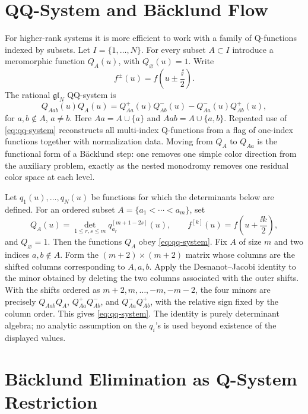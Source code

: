 \section{QQ-System and Bäcklund Flow}

For higher-rank systems it is more efficient to work with a family of
Q-functions indexed by subsets.  Let \(I=\{1,\ldots,N\}\).  For every subset
\(A\subset I\) introduce a meromorphic function \(Q_A(u)\), with
\(Q_\varnothing(u)=1\).  Write
\[
  f^{\pm}(u)=f\!\left(u\pm\frac{\ii}{2}\right).
\]
The rational \(\mathfrak{gl}_N\) QQ-system is
\begin{equation}
  Q_{Aab}(u)Q_A(u)
  =
  Q_{Aa}^{+}(u)Q_{Ab}^{-}(u)
  -
  Q_{Aa}^{-}(u)Q_{Ab}^{+}(u),
  \label{eq:qq-system}
\end{equation}
for \(a,b\notin A\), \(a\ne b\).  Here \(Aa=A\cup\{a\}\) and
\(Aab=A\cup\{a,b\}\).  Repeated use of \eqref{eq:qq-system} reconstructs
all multi-index Q-functions from a flag of one-index functions together with
normalization data.  Moving from \(Q_A\) to \(Q_{Aa}\) is the functional form
of a Bäcklund step: one removes one simple color direction from the auxiliary
problem, exactly as the nested monodromy removes one residual color space at
each level.

Let \(q_1(u),\ldots,q_N(u)\) be functions for which the determinants below
are defined.  For an ordered subset \(A=\{a_1<\cdots<a_m\}\), set
\[
  Q_A(u)
  =
  \det_{1\le r,s\le m}
  q_{a_r}^{[m+1-2s]}(u),
  \qquad
  f^{[k]}(u)=f\!\left(u+\frac{\ii k}{2}\right),
\]
and \(Q_\varnothing=1\).  Then the functions \(Q_A\) obey
\eqref{eq:qq-system}.
Fix \(A\) of size \(m\) and two indices \(a,b\notin A\).  Form the
\((m+2)\times(m+2)\) matrix whose columns are the shifted columns
corresponding to \(A,a,b\).  Apply the Desnanot--Jacobi identity to the
minor obtained by deleting the two columns associated with the outer shifts.
With the shifts ordered as \(m+2,m,\ldots,-m,-m-2\), the four minors are
precisely \(Q_{Aab}Q_A\), \(Q_{Aa}^{+}Q_{Ab}^{-}\), and
\(Q_{Aa}^{-}Q_{Ab}^{+}\), with the relative sign fixed by the column order.
This gives \eqref{eq:qq-system}.  The identity is purely determinant
algebra; no analytic assumption on the \(q_i\)'s is used beyond existence of
the displayed values.

\section{Bäcklund Elimination as Q-System Restriction}
\label{sec:backlund-elimination-qsystem-restriction}

